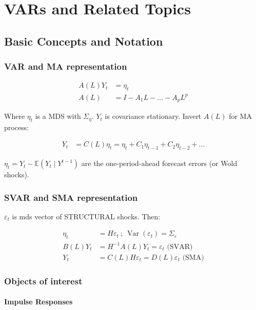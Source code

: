 \section{VARs and Related Topics}

\subsection{Basic Concepts and Notation}

\subsubsection{VAR and MA representation}

\begin{align*}
    A(L) Y_t&=\eta_t \\
    A(L)&=I-A_1 L-\ldots-A_p L^p
\end{align*}

Where $\eta_t$ is a MDS with $\Sigma_\eta$. $Y_t$ is covariance stationary. Invert $A(L)$ for MA process:

\begin{align*}
    Y_t&=C(L) \eta_t =\eta_t+C_1 \eta_{t-1}+C_2 \eta_{t-2}+\ldots
\end{align*}

$\eta_t=Y_t-\mathbb{E}\left(Y_t \mid Y^{t-1}\right)$ are the one-period-ahead forecast errors (or Wold shocks).

\subsubsection{SVAR and SMA representation}

$\varepsilon_t$ is mds vector of STRUCTURAL shocks. Then:

\begin{align*}
    \eta_t&=H \varepsilon_t \: ; \: \operatorname{Var}\left(\varepsilon_t\right) =\Sigma_{\varepsilon} \\
    B(L) Y_t&=H^{-1} A(L) Y_t = \varepsilon_t  \text{ (SVAR)}\\
    Y_t&= C(L) H \varepsilon_t=D(L) \varepsilon_t \text{ (SMA)}
\end{align*}

\subsubsection{Objects of interest}

\paragraph{Impulse Responses}

